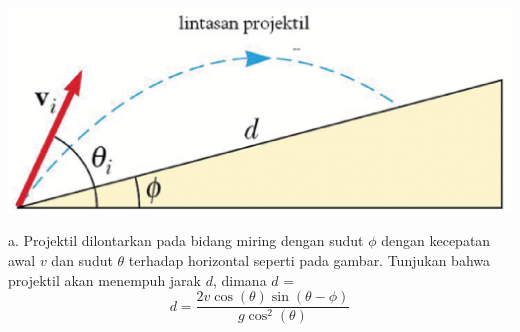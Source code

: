 \item
\mbox{}
\begin{center}
\includegraphics [scale=0.3]{./latex/eps/1_4_1_image_1.eps}
\end{center}a. Projektil dilontarkan pada bidang miring dengan sudut $\phi$ dengan kecepatan awal $v$ dan sudut $\theta$ terhadap horizontal seperti pada gambar. Tunjukan bahwa projektil akan menempuh jarak $d$, dimana $d$ =
\begin{equation*}
        d= \frac{2 v \cos \left(\theta\right) \sin\left(\theta-\phi\right)}{g \cos^2\left(\theta\right)}
\end{equation*}

